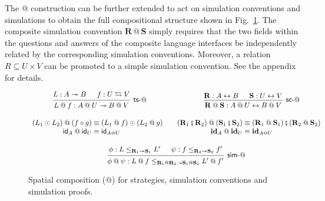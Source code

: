 \documentclass[acmsmall,screen,review,nonacm]{acmart}
\newcommand{\kw}[1]{\ensuremath{ \mathsf{#1} }}
\newcommand{\lensarrow}{\leftrightarrows}
\newcommand{\idsc}{\mathbf{id}} %
\newcommand{\vcomp}{\fatsemi}
\begin{document}
The $\mathbin@$ construction can be further extended
to act on simulation conventions and simulations
to obtain the full compositional structure shown in Fig.~\ref{fig:xcomp}.
The composite simulation convention $\mathbf{R} \mathbin@ \mathbf{S}$
simply requires that the two fields within the questions and answers
of the composite language interfaces
be independently related by the corresponding simulation conventions.
Moreover, a relation $R \subseteq U \times V$
can be promoted to a simple simulation convention.
See the appendix for details.


\begin{figure} %
  \begin{gather*}
    \begin{prooftree}
      \hypo{L : A \twoheadrightarrow B}
      \hypo{f : U \lensarrow V}
      \infer2[\kw{ts}-$\mathbin@$]{
        L \mathbin@ f : A \mathbin@ U \twoheadrightarrow B \mathbin@ V
      }
    \end{prooftree}
    \hspace{8em}
    \begin{prooftree}
      \hypo{\mathbf{R} : A \leftrightarrow B}
      \hypo{\mathbf{S} : U \leftrightarrow V}
      \infer2[\kw{sc}-$\mathbin@$]{
        \mathbf{R} \mathbin@ \mathbf{S} : A \mathbin@ U \leftrightarrow B \mathbin@ V
      }
    \end{prooftree}
    \\[1em]
    \begin{array}{r@{}l}
      (L_1 \odot L_2) \mathbin@ (f \circ g) & {} \equiv
      (L_1 \mathbin@ f) \odot (L_2 \mathbin@ g) \\
      \kw{id}_A \mathbin@ \kw{id}_U & {} \equiv \kw{id}_{A \mathbin@ U}
    \end{array}
    \quad
    \begin{array}{r@{}l}
      (\mathbf{R}_1 \vcomp \mathbf{R}_2) \mathbin@ (\mathbf{S}_1 \vcomp \mathbf{S}_2)
      & {} \equiv
      (\mathbf{R}_1 \mathbin@ \mathbf{S}_1) \vcomp (\mathbf{R}_2 \mathbin@ \mathbf{S}_2)
      \\
      \idsc_A \mathbin@ \idsc_U & {} \equiv \idsc_{A \mathbin@ U}
    \end{array}
    \\[1em]
    \begin{prooftree}
      \hypo{\phi: L \le_{\mathbf{R}_1 \twoheadrightarrow \mathbf{S}_1} L'}
      \hypo{\psi: f \le_{\mathbf{R}_2 \twoheadrightarrow \mathbf{S}_2} f'}
      \infer2[\kw{sim}-$\mathbin@$]{\phi \mathbin@ \psi :
	L \mathbin@ f
        \le_{\mathbf{R}_1 \mathbin@ \mathbf{R}_2 \twoheadrightarrow
             \mathbf{S}_1 \mathbin@ \mathbf{S}_2}
	L' \mathbin@ f'}
    \end{prooftree}
  \end{gather*}
  \caption{Spatial composition ($\mathbin@$) for strategies,
    simulation conventions and simulation proofs.}
  \label{fig:xcomp}
\end{figure}
\end{document}
